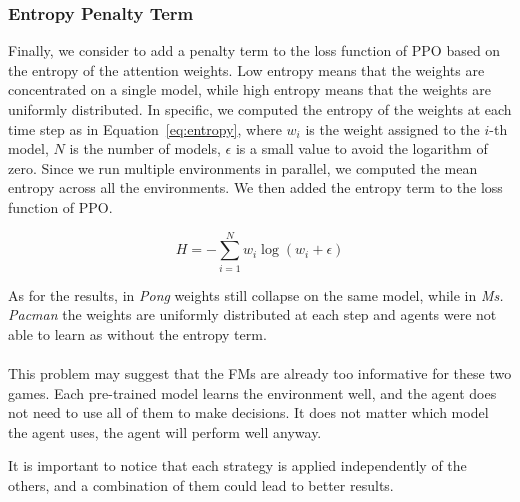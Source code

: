 \subsubsection{Entropy Penalty Term}
Finally, we consider to add a penalty term to the loss function of PPO based on the entropy of the attention weights.
Low entropy means that the weights are concentrated on a single model, while high entropy means that the weights are uniformly distributed.
In specific, we computed the entropy of the weights at each time step as in Equation~\ref{eq:entropy}, where $w_i$ is the weight assigned to the $i$-th model, $N$ is the number of models, $\epsilon$ is a small value to avoid the logarithm of zero.
Since we run multiple environments in parallel, we computed the mean entropy across all the environments.
We then added the entropy term to the loss function of PPO. %

\begin{equation}
    H = -\sum_{i=1}^{N} w_i \log(w_i + \epsilon)
    \label{eq:entropy}
\end{equation}


As for the results, in \textit{Pong} weights still collapse on the same model, while in \textit{Ms. Pacman} the weights are uniformly distributed at each step and agents were not able to learn as without the entropy term. \\ \\


This problem may suggest that the FMs are already too informative for these two games.
Each pre-trained model learns the environment well, and the agent does not need to use all of them to make decisions.
It does not matter which model the agent uses, the agent will perform well anyway.

It is important to notice that each strategy is applied independently of the others, and a combination of them could lead to better results.








